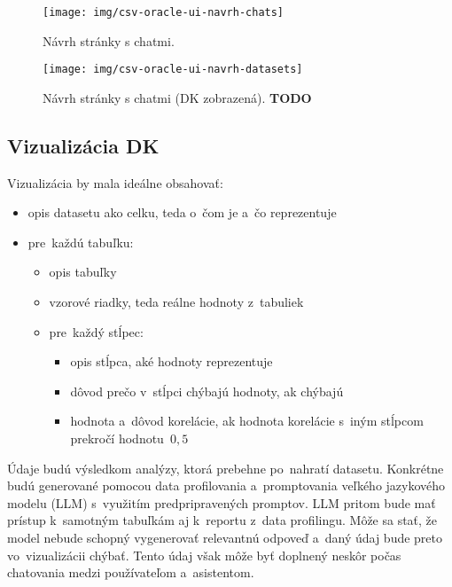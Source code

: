 \begin{figure}[H]\centering
\texttt{[image: img/csv-oracle-ui-navrh-chats]}
\caption{Návrh stránky s chatmi.}
\label{csv-oracle-ui-navrh-chats}
\end{figure}

\begin{figure}[H]\centering
\texttt{[image: img/csv-oracle-ui-navrh-datasets]}
\caption{Návrh stránky s chatmi (DK zobrazená). \textbf{TODO}}
\label{csv-oracle-ui-navrh-datasets}
\end{figure}

\subsection{Vizualizácia DK}
\label{vizualizácia-dk}

Vizualizácia by mala ideálne obsahovať:
\begin{itemize}
\item opis datasetu ako celku, teda o~čom je a~čo reprezentuje
\item pre~každú tabuľku:
\begin{itemize}
\item opis tabuľky
\item vzorové riadky, teda reálne hodnoty z~tabuliek
\item pre~každý stĺpec:
\begin{itemize}
\item opis stĺpca, aké hodnoty reprezentuje
\item dôvod prečo v~stĺpci chýbajú hodnoty, ak chýbajú
\item hodnota a~dôvod korelácie, ak hodnota korelácie s~iným stĺpcom prekročí hodnotu~$0,5$
\end{itemize}
\end{itemize}
\end{itemize}

Údaje budú výsledkom analýzy, ktorá prebehne po~nahratí datasetu. Konkrétne budú generované pomocou data profilovania a~promptovania veľkého jazykového modelu (LLM) s~využitím predpripravených promptov. LLM pritom bude mať prístup k~samotným tabuľkám aj k~reportu z~data profilingu. Môže sa stať, že model nebude schopný vygenerovať relevantnú odpoveď a~daný údaj bude preto vo~vizualizácii chýbať. Tento údaj však môže byť doplnený neskôr počas chatovania medzi používateľom a~asistentom.
